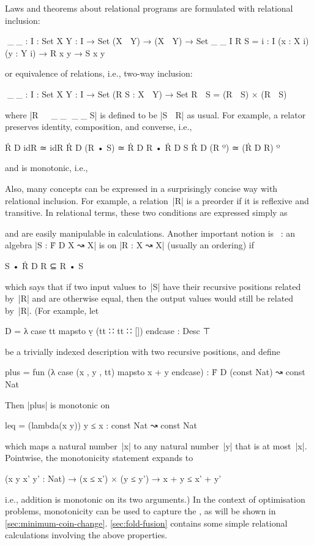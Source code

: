 Laws and theorems about relational programs are formulated with relational inclusion:
\begin{code}
^^^_⊆_ : {I : Set} {X Y : I → Set} (X ↝ Y) → (X ↝ Y) → Set
_⊆_ {I} R S = {i : I} (x : X i) (y : Y i) → R x y → S x y
\end{code}
or equivalence of relations, i.e., two-way inclusion:
\begin{code}
^^^_≃_ : {I : Set} {X Y : I → Set} (R S : X ↝ Y) → Set
R ≃ S = (R ⊆ S) × (R ⊇ S)
\end{code}
where |R ^^^⊇ ^^^_⊇_ ^^^_⊇_ S| is defined to be |S ⊆ R| as usual.
For example, a relator preserves identity, composition, and converse, i.e.,
\begin{code}
Ṙ D idR      ≃ idR
Ṙ D (R • S)  ≃ Ṙ D R • Ṙ D S
Ṙ D (R º)    ≃ (Ṙ D R) º
\end{code}
and is monotonic, i.e.,
Also, many concepts can be expressed in a surprisingly concise way with relational inclusion.
For example, a relation~|R| is a preorder if it is reflexive and transitive.
In relational terms, these two conditions are expressed simply as
and are easily manipulable in calculations.
Another important notion is ~\cite[Section 7.2]{Bird-AoP}: an algebra |S : Ḟ D X ↝ X| is  on |R : X ↝ X| (usually an ordering) if
\begin{code}
S • Ṙ D R ⊆ R • S
\end{code}
which says that if two input values to~|S| have their recursive positions related by~|R| and are otherwise equal, then the output values would still be related by~|R|.
(For example, let
\begin{code}
D = λ case tt mapsto ṿ (tt ∷ tt ∷ []) endcase : Desc ⊤
\end{code}
be a trivially indexed description with two recursive positions, and define
\begin{code}
plus = fun (λ case (x , y , tt) mapsto x + y endcase) : Ḟ D (const Nat) ↝ const Nat
\end{code}
Then |plus| is monotonic on
\begin{code}
leq = (lambda(x y)) y ≤ x : const Nat ↝ const Nat
\end{code}
which maps a natural number~|x| to any natural number~|y| that is at most~|x|.
Pointwise, the monotonicity statement expands to
\begin{code}
(x y x' y' : Nat) → (x ≤ x') × (y ≤ y') → x + y ≤ x' + y'
\end{code}
i.e., addition is monotonic on its two arguments.)
In the context of optimisation problems, monotonicity can be used to capture the , as will be shown in \autoref{sec:minimum-coin-change}.
\autoref{sec:fold-fusion} contains some simple relational calculations involving the above properties.

